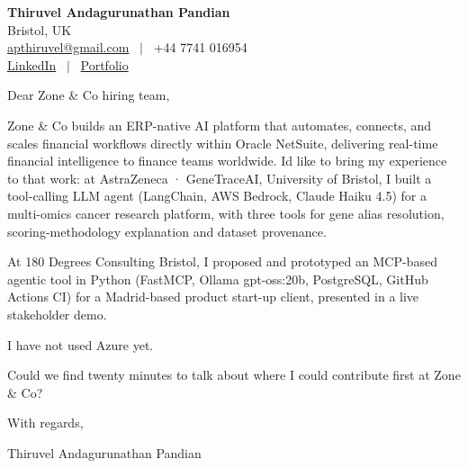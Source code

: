 \documentclass[11pt,a4paper]{article}
\begin{document}
\raggedright
\pagestyle{empty}

\begin{center}
    {\LARGE \color{linkblue} \textbf{Thiruvel Andagurunathan Pandian}}\\[0.2cm]
    Bristol, UK \\
    \href{mailto:apthiruvel@gmail.com}{apthiruvel@gmail.com} \ $|$ \ +44 7741 016954 \\
\href{https://www.linkedin.com/in/thiruvel-a-p/}{LinkedIn} \ $|$ \ \href{https://thiruvel-ap.github.io/PersonalPortfolio/}{Portfolio}
\end{center}

\vspace{0.4cm}

\noindent
Dear Zone \& Co hiring team,

Zone \& Co builds an ERP-native AI platform that automates, connects, and scales financial workflows directly within Oracle NetSuite, delivering real-time financial intelligence to finance teams worldwide. I\textquotesingle{}d like to bring my experience to that work: at AstraZeneca · GeneTraceAI, University of Bristol, I built a tool-calling LLM agent (LangChain, AWS Bedrock, Claude Haiku 4.5) for a multi-omics cancer research platform, with three tools for gene alias resolution, scoring-methodology explanation and dataset provenance.

At 180 Degrees Consulting Bristol, I proposed and prototyped an MCP-based agentic tool in Python (FastMCP, Ollama gpt-oss:20b, PostgreSQL, GitHub Actions CI) for a Madrid-based product start-up client, presented in a live stakeholder demo.

I have not used Azure yet.

Could we find twenty minutes to talk about where I could contribute first at Zone \& Co?

\vspace{0.5cm}

With regards,

Thiruvel Andagurunathan Pandian
\end{document}
